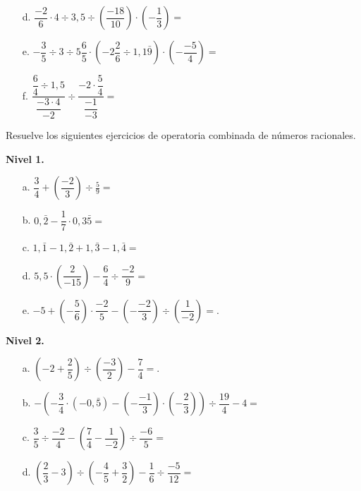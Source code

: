 \documentclass[spanish,letterpaper, 11pt, addpoints, answers]{exam}
\begin{document}
\begin{questions}
\begin{itemize}
  \item[d.] $\dfrac{-2}{6}\cdot 4\div 3{,}5\div \left(\dfrac{-18}{10}\right)\cdot \left(-\dfrac{1}{3}\right)=$

  \item[e.] $-\dfrac{3}{5}\div 3\div 5\dfrac{6}{5}\cdot \left(-2\dfrac{2}{6}\div1{,}1\bar{9}\right)\cdot \left(-\dfrac{-5}{4}\right)=$

  \item[f.] $\dfrac{\dfrac{6}{4}\div 1{,}5}{\dfrac{-3\cdot 4}{-2}}\div\dfrac{-2\cdot \dfrac{5}{4}}{\dfrac{-1}{-3}}=$

\end{itemize}

\question Resuelve los siguientes ejercicios de operatoria combinada de números racionales.

\textbf{Nivel 1.}
\begin{itemize}
\item[a.] $\dfrac{3}{4}+\left(\dfrac{-2}{3}\right)\div \frac{5}{9}=$

\item[b.] $0{,}\bar{2}-\dfrac{1}{7}\cdot 0{,}3\bar{5}=$

\item[c.] $1{,}\bar{1}-1{,}\bar{2}+1{,}\bar{3}-1{,}\bar{4}=$

\item[d.] $5{,}5\cdot \left(\dfrac{2}{-15}\right)-\dfrac{6}{4}\div \dfrac{-2}{9}=$

\item[e.] $-5+\left(-\dfrac{5}{6}\right)\cdot \dfrac{-2}{5}-\left(-\dfrac{-2}{3}\right)\div \left(\dfrac{1}{-2}\right)=$.

\end{itemize}

\textbf{Nivel 2.}
\begin{itemize}
\item[a.] $\left(-2+\dfrac{2}{5}\right)\div \left(\dfrac{-3}{2}\right)-\dfrac{7}{4}=$.

\item[b.] $-\left(-\dfrac{3}{4}\cdot \left(-0{,}\bar{5}\right)-\left(-\dfrac{-1}{3}\right)\cdot\left(-\dfrac{2}{3}\right)\right)\div \dfrac{19}{4}-4=$

\item[c.] $\dfrac{3}{5}\div \dfrac{-2}{4}-\left(\dfrac{7}{4}-\dfrac{1}{-2}\right)\div \dfrac{-6}{5}=$

\item[d.] $\left(\dfrac{2}{3}-3\right)\div\left(-\dfrac{4}{5}+\dfrac{3}{2}\right)-\dfrac{1}{6}\div \dfrac{-5}{12}=$ 


\end{itemize}
\end{questions}
\end{document}
